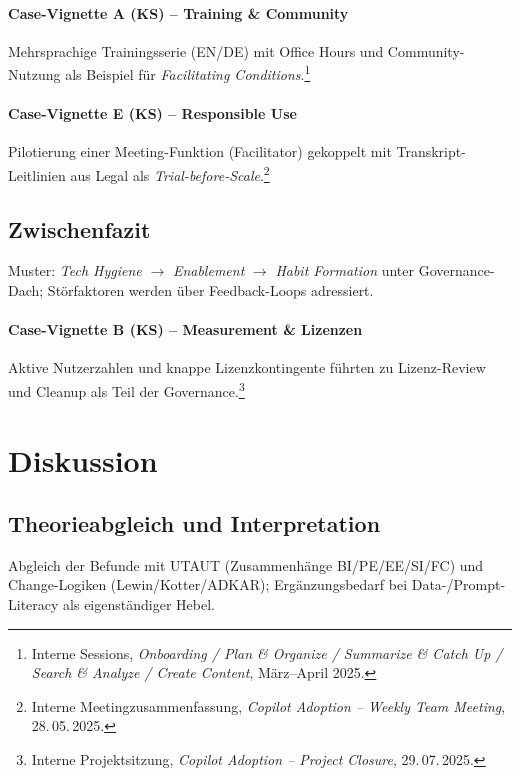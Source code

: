 \documentclass[12pt,a4paper,oneside]{article} %
\begin{document}
\paragraph{Case-Vignette A (KS) – Training \& Community}
Mehrsprachige Trainingsserie (EN/DE) mit Office Hours und Community-Nutzung als Beispiel für \emph{Facilitating Conditions}.\footnote{Interne Sessions, \emph{Onboarding / Plan \& Organize / Summarize \& Catch Up / Search \& Analyze / Create Content}, März–April 2025.}
\paragraph{Case-Vignette E (KS) – Responsible Use}
Pilotierung einer Meeting-Funktion (Facilitator) gekoppelt mit Transkript-Leitlinien aus Legal als \emph{Trial-before-Scale}.\footnote{Interne Meetingzusammenfassung, \emph{Copilot Adoption – Weekly Team Meeting}, 28.\,05.\,2025.}

\subsection{Zwischenfazit}
Muster: \emph{Tech Hygiene} $\rightarrow$ \emph{Enablement} $\rightarrow$ \emph{Habit Formation} unter Governance-Dach; Störfaktoren werden über Feedback-Loops adressiert.
\paragraph{Case-Vignette B (KS) – Measurement \& Lizenzen}
Aktive Nutzerzahlen und knappe Lizenzkontingente führten zu Lizenz-Review und Cleanup als Teil der Governance.\footnote{Interne Projektsitzung, \emph{Copilot Adoption – Project Closure}, 29.\,07.\,2025.}


\section{Diskussion}
\subsection{Theorieabgleich und Interpretation}
Abgleich der Befunde mit UTAUT (Zusammenhänge BI/PE/EE/SI/FC) und Change-Logiken (Lewin/Kotter/ADKAR); Ergänzungsbedarf bei Data-/Prompt-Literacy als eigenständiger Hebel.
\end{document}
